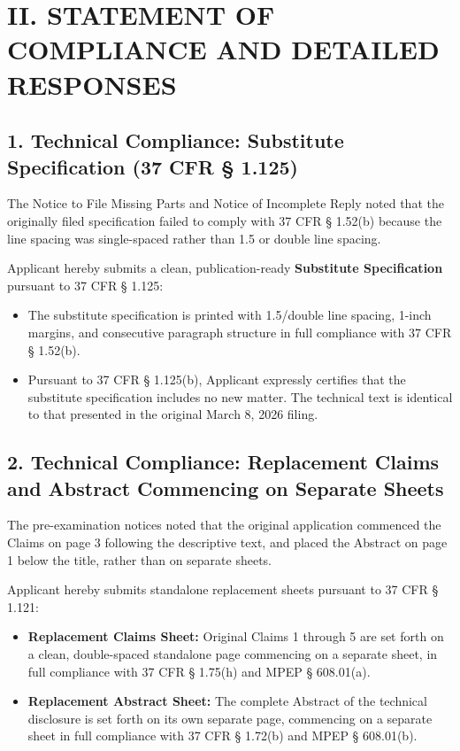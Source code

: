 \documentclass[11pt,letterpaper]{article}
\begin{document}
\newpage

\section*{II. STATEMENT OF COMPLIANCE AND DETAILED RESPONSES}

\subsection*{1. Technical Compliance: Substitute Specification (37 CFR \S{} 1.125)}

The Notice to File Missing Parts and Notice of Incomplete Reply noted that the originally filed specification failed to comply with 37 CFR \S{} 1.52(b) because the line spacing was single-spaced rather than 1.5 or double line spacing.

Applicant hereby submits a clean, publication-ready \textbf{Substitute Specification} pursuant to 37 CFR \S{} 1.125:
\begin{itemize}[leftmargin=2em, itemsep=2pt, parsep=0pt]
    \item The substitute specification is printed with 1.5/double line spacing, 1-inch margins, and consecutive paragraph structure in full compliance with 37 CFR \S{} 1.52(b).
    \item Pursuant to 37 CFR \S{} 1.125(b), Applicant expressly certifies that the substitute specification includes no new matter. The technical text is identical to that presented in the original March 8, 2026 filing.
\end{itemize}

\subsection*{2. Technical Compliance: Replacement Claims and Abstract Commencing on Separate Sheets}

The pre-examination notices noted that the original application commenced the Claims on page 3 following the descriptive text, and placed the Abstract on page 1 below the title, rather than on separate sheets.

Applicant hereby submits standalone replacement sheets pursuant to 37 CFR \S{} 1.121:
\begin{itemize}[leftmargin=2em, itemsep=2pt, parsep=0pt]
    \item \textbf{Replacement Claims Sheet:} Original Claims 1 through 5 are set forth on a clean, double-spaced standalone page commencing on a separate sheet, in full compliance with 37 CFR \S{} 1.75(h) and MPEP \S{} 608.01(a).
    \item \textbf{Replacement Abstract Sheet:} The complete Abstract of the technical disclosure is set forth on its own separate page, commencing on a separate sheet in full compliance with 37 CFR \S{} 1.72(b) and MPEP \S{} 608.01(b).
\end{itemize}
\end{document}
